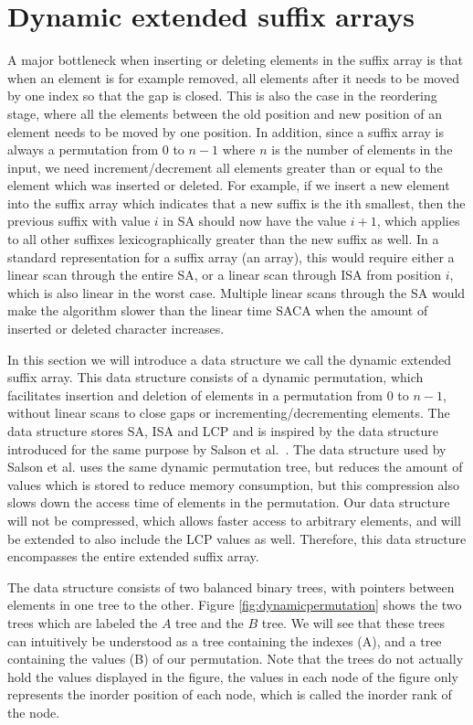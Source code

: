\section{Dynamic extended suffix arrays}

A major bottleneck when inserting or deleting elements in the suffix array is that when an
element is for example removed, all elements after it needs to be moved by one index so
that the gap is closed. This is also the case in the reordering stage, where all the
elements between the old position and new position of an element needs to be moved by one
position. In addition, since a suffix array is always a permutation from $0$ to $n - 1$
where $n$ is the number of elements in the input, we need increment/decrement all elements
greater than or equal to the element which was inserted or deleted. For example, if we
insert a new element into the suffix array which indicates that a new suffix is the ith
smallest, then the previous suffix with value $i$ in SA should now have the value $i + 1$,
which applies to all other suffixes lexicographically greater than the new suffix as well.
In a standard representation for a suffix array (an array), this would require either a
linear scan through the entire SA, or a linear scan through ISA from position $i$, which
is also linear in the worst case. Multiple linear scans through the SA would make the
algorithm slower than the linear time SACA when the amount of inserted or deleted
character increases. 

In this section we will introduce a data structure we call the dynamic extended suffix
array. This data structure consists of a dynamic permutation, which facilitates insertion
and deletion of elements in a permutation from $0$ to $n - 1$, without linear scans to
close gaps or incrementing/decrementing elements. The data structure stores SA, ISA and
LCP and is inspired by the data structure introduced for the same purpose by Salson et
al.~\cite{DynamicExtendedSuffixArrays}. The data structure used by Salson et al. uses the
same dynamic permutation tree, but reduces the amount of values which is stored to reduce
memory consumption, but this compression also slows down the access time of elements in
the permutation. Our data structure will not be compressed, which allows faster access to
arbitrary elements, and will be extended to also include the LCP values as well.
Therefore, this data structure encompasses the entire extended suffix array.

The data structure consists of two balanced binary trees, with pointers between elements
in one tree to the other. Figure \ref{fig:dynamicpermutation} shows the two trees which
are labeled the $A$ tree and the $B$ tree. We will see that these trees can intuitively be
understood as a tree containing the indexes (A), and a tree containing the values (B) of
our permutation. Note that the trees do not actually hold the values displayed in the
figure, the values in each node of the figure only represents the inorder position of each
node, which is called the inorder rank of the node.

